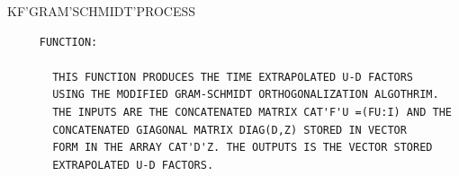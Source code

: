 \begin{frame}
KF'GRAM'SCHMIDT'PROCESS
\begin{verbatim}
     FUNCTION:

       THIS FUNCTION PRODUCES THE TIME EXTRAPOLATED U-D FACTORS
       USING THE MODIFIED GRAM-SCHMIDT ORTHOGONALIZATION ALGOTHRIM.
       THE INPUTS ARE THE CONCATENATED MATRIX CAT'F'U =(FU:I) AND THE
       CONCATENATED GIAGONAL MATRIX DIAG(D,Z) STORED IN VECTOR
       FORM IN THE ARRAY CAT'D'Z. THE OUTPUTS IS THE VECTOR STORED
       EXTRAPOLATED U-D FACTORS.


\end{verbatim}
\end{frame}

